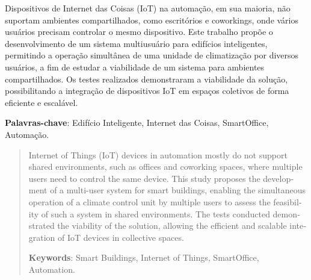\begin{resumo}
    Dispositivos de Internet das Coisas (IoT) na automação, em sua maioria, não suportam ambientes compartilhados, como escritórios e coworkings,
    onde vários usuários precisam controlar o mesmo dispositivo. Este trabalho propõe o desenvolvimento de um sistema multiusuário para edifícios
    inteligentes, permitindo a operação simultânea de uma unidade de climatização por diversos usuários, a fim de estudar a viabilidade de um
    sistema para ambientes compartilhados. Os testes realizados demonstraram a viabilidade da solução, possibilitando a integração de dispositivos
    IoT em espaços coletivos de forma eficiente e escalável.
    
    \vspace{\onelineskip}
    \noindent
    \textbf{Palavras-chave}: Edifício Inteligente, Internet das Coisas, SmartOffice, Automação.
\end{resumo}
    
\begin{otherlanguage}{english}
\begin{abstract}
    Internet of Things (IoT) devices in automation mostly do not support shared environments, such as offices and coworking spaces, 
    where multiple users need to control the same device. This study proposes the development of a multi-user system for smart buildings,
    enabling the simultaneous operation of a climate control unit by multiple users to assess the feasibility of such a system in shared environments.
    The tests conducted demonstrated the viability of the solution, allowing the efficient and scalable integration of IoT devices in collective spaces.
    
    \vspace{\onelineskip}
    \noindent
    \textbf{Keywords}: Smart Buildings, Internet of Things, SmartOffice, Automation.
\end{abstract}
\end{otherlanguage}

\newpage